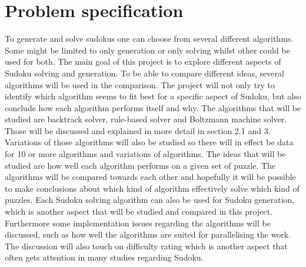 \documentclass[a4paper,11pt]{kth-mag}
\begin{document}
\section{Problem specification}
To generate and solve sudokus one can choose from several different algorithms. 
Some might be limited to only generation or only solving whilst other could be used for both. 
The main goal of this project is to explore different aspects of Sudoku solving and generation.
To be able to compare different ideas, several algorithms will be used in the comparison. 
The project will not only try to identify which algorithm seems to fit best for 
a specific aspect of Sudoku, but also conclude how each algorithm performs itself and why.
\newline
The algorithms that will be studied are backtrack solver, rule-based solver and
Boltzmann machine solver. 
Those will be discussed and explained in more detail in section 2.1 and 3. 
Variations of those algorithms will also be studied so there will in effect 
be data for 10 or more algorithms and variations of algorithms.
\newline
The ideas that will be studied are how well each algorithm performs on a given set of puzzle. 
The algorithms will be compared towards each other and hopefully it will be possible to make 
conclusions about which kind of algorithm effectively solve which kind of puzzles. 
Each Sudoku solving algorithm can also be used for Sudoku generation, which is another 
aspect that will be studied and compared in this project.
Furthermore some implementation 
issues regarding the algorithms will be discussed, 
such as how well the algorithms are suited for parallelising the work. 
The discussion will also touch on difficulty rating which is another aspect that often 
gets attention in many studies regarding Sudoku.
\end{document}
